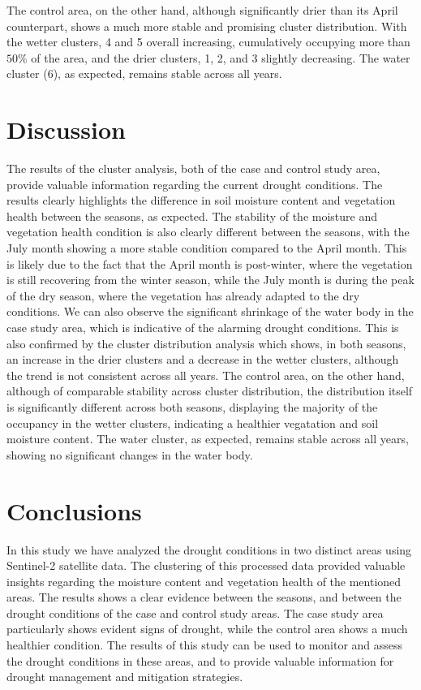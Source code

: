\documentclass[10pt,twocolumn]{article}
\begin{document}
The control area, on the other hand, although significantly drier than its April counterpart, shows a much more stable and promising cluster distribution. With the wetter clusters, 4 and 5 overall increasing, cumulatively occupying more than $50\%$ of the area, and the drier clusters, 1, 2, and 3 slightly decreasing. The water cluster (6), as expected, remains stable across all years.



\section{Discussion}
The results of the cluster analysis, both of the case and control study area, provide valuable information regarding the current drought conditions. The results clearly highlights the difference in soil moisture content and vegetation health between the seasons, as expected.
The stability of the moisture and vegetation health condition is also clearly different between the seasons, with the July month showing a more stable condition compared to the April month. This is likely due to the fact that the April month is post-winter, where the vegetation is still recovering from the winter season, while the July month is during the peak of the dry season, where the vegetation has already adapted to the dry conditions.
We can also observe the significant shrinkage of the water body in the case study area, which is indicative of the alarming drought conditions. This is also confirmed by the cluster distribution analysis which shows, in both seasons, an increase in the drier clusters and a decrease in the wetter clusters, although the trend is not consistent across all years.
The control area, on the other hand, although of comparable stability across cluster distribution, the distribution itself is significantly different across both seasons, displaying the majority of the occupancy in the wetter clusters, indicating a healthier vegatation and soil moisture content. The water cluster, as expected, remains stable across all years, showing no significant changes in the water body.

\section{Conclusions}
In this study we have analyzed the drought conditions in two distinct areas using Sentinel-2 satellite data. The clustering of this processed data provided valuable insights regarding the moisture content and vegetation health of the mentioned areas. The results shows a clear evidence between the seasons, and between the drought conditions of the case and control study areas. The case study area particularly shows evident signs of drought, while the control area shows a much healthier condition. The results of this study can be used to monitor and assess the drought conditions in these areas, and to provide valuable information for drought management and mitigation strategies.
\end{document}
